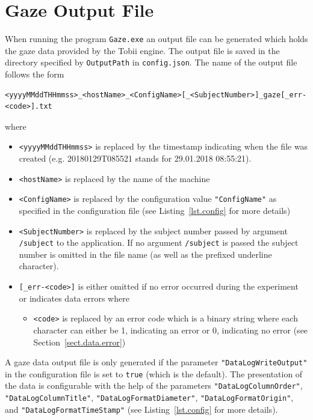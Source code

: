 \documentclass[a4paper,oneside]{book}
\begin{document}
\section{Gaze Output File}
\label{sec.output.gaze}
When running the program \texttt{Gaze.exe} an output file can be generated which holds the gaze data provided by the Tobii engine.
The output file is saved in the directory specified by \texttt{OutputPath} in \texttt{config.json}.
The name of the output file follows the form
\begin{lstlisting}
<yyyyMMddTHHmmss>_<hostName>_<ConfigName>[_<SubjectNumber>]_gaze[_err-<code>].txt
\end{lstlisting}
where
\begin{itemize}
    \item \texttt{<yyyyMMddTHHmmss>} is replaced by the timestamp indicating when the file was created (e.g. 20180129T085521 stands for 29.01.2018 08:55:21).
    \item \texttt{<hostName>} is replaced by the name of the machine
    \item \texttt{<ConfigName>} is replaced by the configuration value \texttt{"ConfigName"} as specified in the configuration file (see Listing~\ref{lst.config} for more details)
    \item \texttt{<SubjectNumber>} is replaced by the subject number passed by argument \texttt{/subject} to the application.
        If no argument \texttt{/subject} is passed the subject number is omitted in the file name (as well as the prefixed underline character).
    \item \texttt{[\_err-<code>]} is either omitted if no error occurred during the experiment or indicates data errors where
        \begin{itemize}
            \item \texttt{<code>} is replaced by an error code which is a binary string where each character can either be 1, indicating an error or 0, indicating no error (see Section~\ref{sect.data.error})
        \end{itemize}
\end{itemize}

A gaze data output file is only generated if the parameter \texttt{"DataLogWriteOutput"} in the configuration file is set to \texttt{true} (which is the default).
The presentation of the data is configurable with the help of the parameters \texttt{"DataLogColumnOrder"}, \texttt{"DataLogColumnTitle"}, \texttt{"DataLogFormatDiameter"}, \texttt{"DataLogFormatOrigin"}, and \texttt{"DataLogFormatTimeStamp"} (see Listing~\ref{lst.config} for more details).
\end{document}
